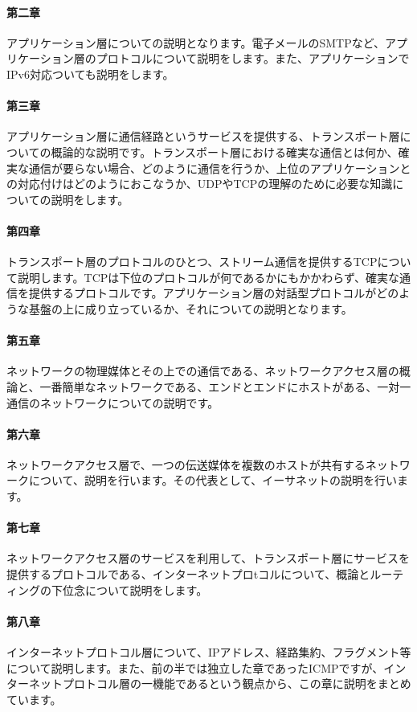 \paragraph{第二章}
アプリケーション層についての説明となります。電子メールのSMTPなど、アプリケーション層のプロトコルについて説明をします。また、アプリケーションでIPv6対応ついても説明をします。

\paragraph{第三章}
アプリケーション層に通信経路というサービスを提供する、トランスポート層についての概論的な説明です。トランスポート層における確実な通信とは何か、確実な通信が要らない場合、どのように通信を行うか、上位のアプリケーションとの対応付けはどのようにおこなうか、UDPやTCPの理解のために必要な知識についての説明をします。

\paragraph{第四章}
トランスポート層のプロトコルのひとつ、ストリーム通信を提供するTCPについて説明します。TCPは下位のプロトコルが何であるかにもかかわらず、確実な通信を提供するプロトコルです。アプリケーション層の対話型プロトコルがどのような基盤の上に成り立っているか、それについての説明となります。

\paragraph{第五章}
ネットワークの物理媒体とその上での通信である、ネットワークアクセス層の概論と、一番簡単なネットワークである、エンドとエンドにホストがある、一対一通信のネットワークについての説明です。

\paragraph{第六章}
ネットワークアクセス層で、一つの伝送媒体を複数のホストが共有するネットワークについて、説明を行います。その代表として、イーサネットの説明を行います。

\paragraph{第七章}
ネットワークアクセス層のサービスを利用して、トランスポート層にサービスを提供するプロトコルである、インターネットプロtコルについて、概論とルーティングの下位念について説明をします。

\paragraph{第八章}
インターネットプロトコル層について、IPアドレス、経路集約、フラグメント等について説明します。また、前の半では独立した章であったICMPですが、インターネットプロトコル層の一機能であるという観点から、この章に説明をまとめています。

